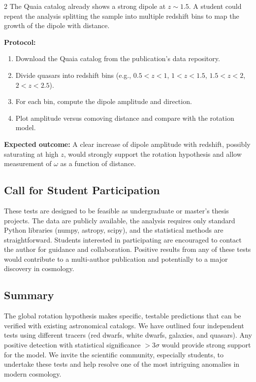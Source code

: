 \documentclass[12pt,a4paper]{article}
\begin{document}
\begin{multicols}{2}
		The Quaia catalog \cite{Secrest2025} already shows a strong dipole at \(z\sim1.5\). A student could repeat the analysis splitting the sample into multiple redshift bins to map the growth of the dipole with distance.
		
		\textbf{Protocol:}
		\begin{enumerate}
			\item Download the Quaia catalog from the publication's data repository.
			\item Divide quasars into redshift bins (e.g., \(0.5<z<1\), \(1<z<1.5\), \(1.5<z<2\), \(2<z<2.5\)).
			\item For each bin, compute the dipole amplitude and direction.
			\item Plot amplitude versus comoving distance and compare with the rotation model.
		\end{enumerate}
		
		\textbf{Expected outcome:} A clear increase of dipole amplitude with redshift, possibly saturating at high \(z\), would strongly support the rotation hypothesis and allow measurement of \(\omega\) as a function of distance.
		
		\subsection{Call for Student Participation}
		
		These tests are designed to be feasible as undergraduate or master's thesis projects. The data are publicly available, the analysis requires only standard Python libraries (numpy, astropy, scipy), and the statistical methods are straightforward. Students interested in participating are encouraged to contact the author for guidance and collaboration. Positive results from any of these tests would contribute to a multi-author publication and potentially to a major discovery in cosmology.
		
		\subsection{Summary}
		
		The global rotation hypothesis makes specific, testable predictions that can be verified with existing astronomical catalogs. We have outlined four independent tests using different tracers (red dwarfs, white dwarfs, galaxies, and quasars). Any positive detection with statistical significance \(>3\sigma\) would provide strong support for the model. We invite the scientific community, especially students, to undertake these tests and help resolve one of the most intriguing anomalies in modern cosmology.
		

\end{multicols}
\end{document}
